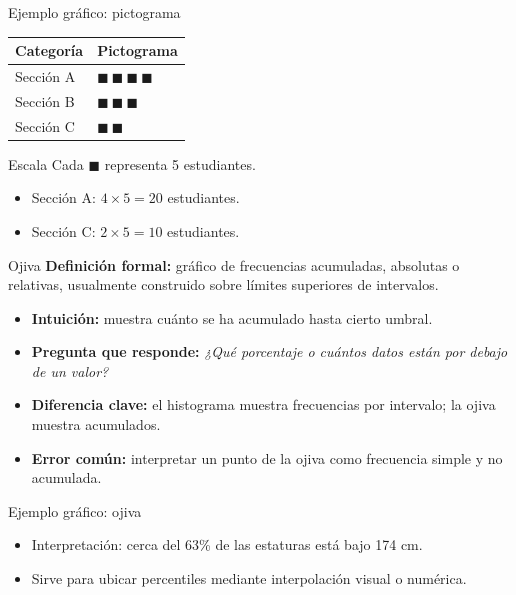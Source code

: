 \documentclass[aspectratio=169,11pt]{beamer}
\newcommand{\pregunta}[1]{\textbf{Pregunta que responde:} \emph{#1}}
\newcommand{\errorcomun}[1]{\textbf{Error común:} #1}
\newcommand{\diferencia}[1]{\textbf{Diferencia clave:} #1}
\begin{document}
\begin{frame}{Ejemplo gráfico: pictograma}
\centering
\begin{tabular}{ll}
\toprule
Categoría & Pictograma \\
\midrule
Sección A & $\blacksquare\ \blacksquare\ \blacksquare\ \blacksquare$ \\
Sección B & $\blacksquare\ \blacksquare\ \blacksquare$ \\
Sección C & $\blacksquare\ \blacksquare$ \\
\bottomrule
\end{tabular}
\vspace{0.7em}
\begin{block}{Escala}
Cada $\blacksquare$ representa 5 estudiantes.
\end{block}
\begin{itemize}
  \item Sección A: $4\times 5=20$ estudiantes.
  \item Sección C: $2\times 5=10$ estudiantes.
\end{itemize}
\end{frame}

\begin{frame}{Ojiva}
\textbf{Definición formal:} gráfico de frecuencias acumuladas, absolutas o relativas, usualmente construido sobre límites superiores de intervalos.
\begin{itemize}
  \item \textbf{Intuición:} muestra cuánto se ha acumulado hasta cierto umbral.
  \item \pregunta{¿Qué porcentaje o cuántos datos están por debajo de un valor?}
  \item \diferencia{el histograma muestra frecuencias por intervalo; la ojiva muestra acumulados.}
  \item \errorcomun{interpretar un punto de la ojiva como frecuencia simple y no acumulada.}
\end{itemize}
\end{frame}

\begin{frame}{Ejemplo gráfico: ojiva}
\centering
{}
\vspace{0.4em}
\begin{itemize}
  \item Interpretación: cerca del 63\% de las estaturas está bajo 174 cm.
  \item Sirve para ubicar percentiles mediante interpolación visual o numérica.
\end{itemize}
\end{frame}
\end{document}
